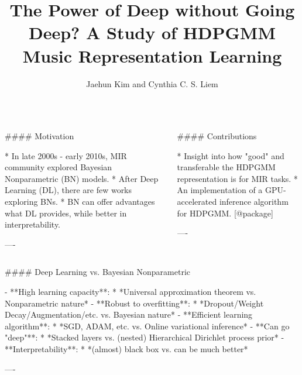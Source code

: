 \documentclass{beamer}
\author[j.h.kim@tudelft.nl]{Jaehun Kim and Cynthia C. S. Liem}
\title{The Power of Deep without Going Deep? A Study of HDPGMM Music Representation Learning}
\institute{Delft University of Technology}
\begin{document}
\begin{frame}[fragile]\centering

\begin{columns}
\begin{column}{0.46\textwidth}

\begin{markdown}

#### Motivation

* In late 2000s - early 2010s, MIR community explored Bayesian Nonparametric (BN) models.
* After Deep Learning (DL), there are few works exploring BNs.
* BN can offer advantages what DL provides, while better in interpretability.

----
\end{markdown}
\end{column}

\begin{column}{.46\textwidth}
\begin{markdown}

#### Contributions

* Insight into how "good" and transferable the HDPGMM representation is for MIR tasks.
* An implementation of a GPU-accelerated inference algorithm for HDPGMM. [@package]

----
\end{markdown}
\end{column}

\end{columns}

\bigskip
{\hrulefill}
\bigskip


\begin{columns}[T]

\begin{column}{.46\textwidth}

\begin{markdown}


#### Deep Learning vs. Bayesian Nonparametric

- **High learning capacity**:
    * *Universal approximation theorem vs. Nonparametric nature*
- **Robust to overfitting**:
    * *Dropout/Weight Decay/Augmentation/etc. vs. Bayesian nature*
- **Efficient learning algorithm**:
    * *SGD, ADAM, etc. vs. Online variational inference*
- **Can go "deep"**:
    * *Stacked layers vs. (nested) Hierarchical Dirichlet process prior*
- **Interpretability**:
    * *(almost) black box vs. can be much better*

----


\end{markdown}
\end{column}
\end{columns}
\end{frame}
\end{document}
